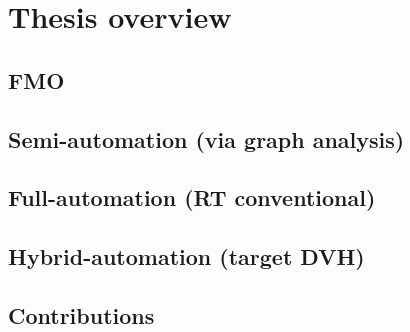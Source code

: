 \section{Thesis overview}

\subsection{FMO}

\subsection{Semi-automation (via graph analysis)}

\subsection{Full-automation (RT conventional)}

\subsection{Hybrid-automation (target DVH)}

\subsection{Contributions}

